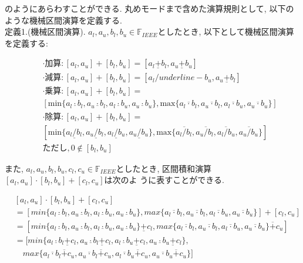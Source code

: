 \documentclass[11pt,a4paper]{jsreport}
\theoremstyle{definition}
\begin{document}
\noindent のようにあらわすことができる. 丸めモードまで含めた演算規則として, 以下のような機械区間演算を定義する. \\
定義1.(機械区間演算). $a_l,a_u,b_l,b_u \in \mathbb{F}_{IEEE}$としたとき, 以下として機械区間演算を定義する:

\begin{align*}
&\cdot\text{加算}: [a_l,a_u] + [b_l,b_u] = [a_l \underline{+} b_l,a_u \underline{+} b_u] \\
&\cdot\text{減算}: [a_l,a_u] + [b_l,b_u] = [a_l /underline{-} b_u,a_u \underline{+} b_l] \\
&\cdot\text{乗算}: [a_l,a_u] + [b_l,b_u] = \\
  \quad &[\text{min}\{a_l \underline{\cdot} b_l,a_u \underline{\cdot} b_l,a_l \underline{\cdot} b_u,a_u \underline{\cdot} b_u\},\text{max}\{a_l \overline{\cdot} b_l,a_u \overline{\cdot} b_l,a_l \overline{\cdot} b_u,a_u \overline{\cdot} b_u\}] \\
&\cdot\text{除算}: [a_l,a_u] + [b_l,b_u] = \\
  \quad&[\text{min}\{a_l \underline{/} b_l,a_u \underline{/} b_l,a_l \underline{/} b_u,a_u \underline{/} b_u\},\text{max}\{a_l \overline{/} b_l,a_u \overline{/} b_l,a_l \overline{/} b_u,a_u \overline{/} b_u\}] \\
  &ただし,0 \notin [b_l,b_u]
\end{align*}

  また, $a_l,a_u,b_l,b_u,c_l,c_u \in \mathbb{F}_{IEEE}$としたとき, 区間積和演算$[a_l,a_u]\cdot[b_l,b_u] + [c_l,c_u]$は次のよ
うに表すことができる.

\begin{align*}
&[a_l,a_u]\cdot[b_l,b_u] + [c_l,c_u] \\
&= [min\{a_l \underline{\cdot} b_l,a_u \underline{\cdot} b_l,a_l \underline{\cdot} b_u,a_u \underline{\cdot} b_u\},max\{a_l \overline{\cdot} b_l,a_u \overline{\cdot} b_l,a_l \overline{\cdot} b_u,a_u \overline{\cdot} b_u\}] + [c_l,c_u] \\
&= [min\{a_l \underline{\cdot} b_l,a_u \underline{\cdot} b_l,a_l \underline{\cdot} b_u,a_u \underline{\cdot} b_u\}\underline{+}c_l,max\{a_l \overline{\cdot} b_l,a_u \overline{\cdot} b_l,a_l \overline{\cdot} b_u,a_u \overline{\cdot} b_u\}\overline{+}c_u] \\
&= [min\{a_l \underline{\cdot} b_l \underline{+} c_l,a_u \underline{\cdot} b_l \underline{+} c_l,a_l \underline{\cdot} b_u \underline{+} c_l,a_u \underline{\cdot} b_u \underline{+} c_l\}, \\
& \quad max\{a_l \overline{\cdot} b_l \overline{+} c_u,a_u \overline{\cdot} b_l \overline{+} c_u,a_l \overline{\cdot} b_u \overline{+} c_u,a_u \overline{\cdot} b_u \overline{+} c_u\}] \\
\end{align*}
\end{document}
